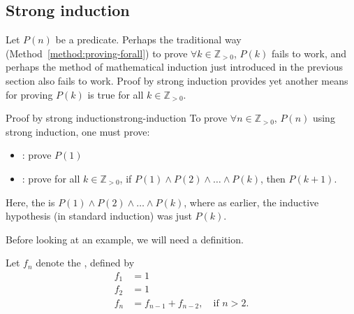\documentclass{book}
\theoremstyle{ekimcustom}
\newcommand\defn[1]{{\color{blue}{\bf #1}}}
\begin{document}
\subsection{Strong induction}

Let $P(n)$ be a predicate. Perhaps the traditional way (Method~\ref{method:proving-forall}) to prove $\forall k \in \mathbb{Z}_{>0}$, $P(k)$ fails to work, and perhaps the method of mathematical induction just introduced in the previous section also fails to work. Proof by strong induction provides yet another means for proving $P(k)$ is true for all $k \in \mathbb{Z}_{>0}$.

\begin{bmethod}{Proof by strong induction}{strong-induction}
To prove $\forall n \in \mathbb{Z}_{>0}$, $P(n)$ using strong induction, one must prove:
\begin{itemize}
\item \defn{base case}: prove $P(1)$
\item \defn{inductive step}: prove for all $k \in \mathbb{Z}_{>0}$, if $P(1) \wedge P(2) \wedge \dots \wedge P(k)$, then $P(k+1)$.
\end{itemize}
Here, the \defn{inductive hypothesis} is $P(1) \wedge P(2) \wedge \dots \wedge P(k)$, where as earlier, the inductive hypothesis (in standard induction) was just $P(k)$.
\end{bmethod}

Before looking at an example, we will need a definition.
\begin{bdefinition}{}{}
Let $f_n$ denote the \defn{Fibonacci sequence}, defined by
\begin{align*}
f_1 &= 1\\
f_2 &= 1\\
f_n &= f_{n-1}+f_{n-2}, \quad \text{if } n > 2.
\end{align*}
\end{bdefinition}
\end{document}

